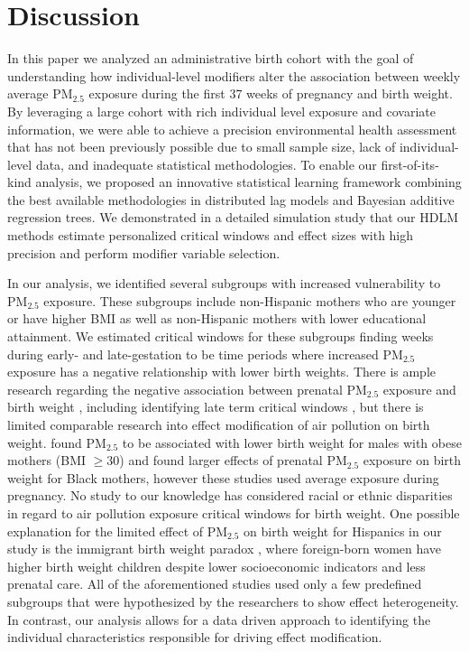\documentclass[12pt]{article}
\begin{document}
\section{Discussion}
In this paper we analyzed an administrative birth cohort with the goal of understanding how individual-level modifiers alter the association between weekly average PM$_{2.5}$ exposure during the first 37 weeks of pregnancy and birth weight. By leveraging a large cohort with rich individual level exposure and covariate information, we were able to achieve a precision environmental health assessment that has not been previously possible due to small sample size, lack of individual-level data, and inadequate statistical methodologies. To enable our first-of-its-kind analysis, we proposed an innovative statistical learning framework combining the best available methodologies in distributed lag models and Bayesian additive regression trees. We demonstrated in a detailed simulation study that our HDLM methods estimate personalized critical windows and effect sizes with high precision and perform modifier variable selection.

In our analysis, we identified several subgroups with increased vulnerability to PM$_{2.5}$ exposure. These subgroups include non-Hispanic mothers who are younger or have higher BMI as well as non-Hispanic mothers with lower educational attainment. We estimated critical windows for these subgroups finding weeks during early- and late-gestation to be time periods where increased PM$_{2.5}$ exposure has a negative relationship with lower birth weights. There is ample research regarding the negative association between prenatal PM$_{2.5}$ exposure and birth weight \citep{Stieb2012, Lamichhane2015AOutcomes}, including identifying late term critical windows \citep{Sun2016TheMeta-analysis}, but there is limited comparable research into effect modification of air pollution on birth weight. \citet{Lakshmanan2015AssociationsIndex} found PM$_{2.5}$ to be associated with lower birth weight for males with obese mothers (BMI $\geq30$) and \citet{Bell2007AmbientMassachusetts} found larger effects of prenatal PM$_{2.5}$ exposure on birth weight for Black mothers, however these studies used average exposure during pregnancy. No study to our knowledge has considered racial or ethnic disparities in regard to air pollution exposure critical windows for birth weight. One possible explanation for the limited effect of PM$_{2.5}$ on birth weight for Hispanics in our study is the immigrant birth weight paradox \citep{Chu2022ThePollution}, where foreign-born women have higher birth weight children despite lower socioeconomic indicators and less prenatal care. All of the aforementioned studies used only a few predefined subgroups that were hypothesized by the researchers to show effect heterogeneity. In contrast, our analysis allows for a data driven approach to identifying the individual characteristics responsible for driving effect modification.
\end{document}
